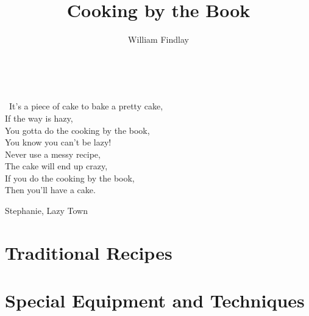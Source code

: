 \documentclass[a4paper,11pt]{memoir}
\title{Cooking by the Book}
\author{William Findlay}
\newcommand\partnote{}
\begin{document}
\maketitle
\thispagestyle{empty}
\newpage
\setcounter{page}{1}

{
  \hypersetup{linkcolor=black}
  \tableofcontents
}

\newpage
\thispagestyle{empty}
\
\vfill
\begin{minipage}{0.7\textwidth}
\epigraph{
\twonotes~It's a piece of cake to bake a pretty cake,\\
If the way is hazy,\\
You gotta do the cooking by the book,\\
You know you can't be lazy!\\
Never use a messy recipe,\\
The cake will end up crazy,\\
If you do the cooking by the book,\\
Then you'll have a cake.~\eighthnote}{Stephanie, Lazy Town}
\end{minipage}
\vfill
\newpage

\setcounter{page}{1}


\renewcommand*{\partnote}{
\epigraph{Tradition is not the worship of ashes, but the preservation of fire.}{Gustav Mahler}
}
\part{Traditional Recipes}



\renewcommand*{\partnote}{
\epigraph{In department stores, so much kitchen equipment is bought indiscriminately by people who just come in for men's underwear. }{Julia Child}
}
\part{Special Equipment and Techniques}





\end{document}
